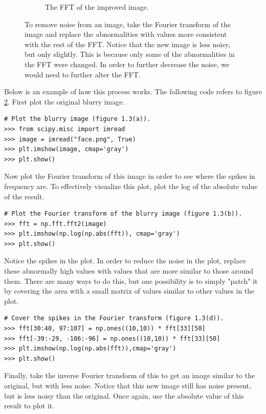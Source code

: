 \begin{figure}
\begin{subfigure}{.4\textwidth}
    \caption{The FFT of the improved image.}
    \label{fig:improved_face}
\end{subfigure}
\label{fig:image_fft}
\caption{To remove noise from an image, take the Fourier transform of the image and replace the abnormalities with values more consistent with the rest of the FFT. 
Notice that the new image is less noisy, but only slightly.
This is because only some of the abnormalities in the FFT were changed.
In order to further decrease the noise, we would need to further alter the FFT.}
\end{figure}

Below is an example of how this process works.
The following code refers to figure \ref{fig:image_fft}.
First plot the original blurry image.

\begin{lstlisting}
# Plot the blurry image (figure 1.3(a)).
>>> from scipy.misc import imread
>>> image = imread("face.png", True)
>>> plt.imshow(image, cmap='gray')
>>> plt.show()
\end{lstlisting}

Now plot the Fourier transform of this image in order to see where the spikes in frequency are.
To effectively visualize this plot, plot the log of the absolute value of the result.

\begin{lstlisting}
# Plot the Fourier transform of the blurry image (figure 1.3(b)).
>>> fft = np.fft.fft2(image)
>>> plt.imshow(np.log(np.abs(fft)), cmap='gray')
>>> plt.show()
\end{lstlisting}

Notice the spikes in the plot.
In order to reduce the noise in the plot, replace these abnormally high values with values that are more similar to those around them.
There are many ways to do this, but one possibility is to simply "patch" it by covering the area with a small matrix of values similar to other values in the plot.

\begin{lstlisting}
# Cover the spikes in the Fourier transform (figure 1.3(d)).
>>> fft[30:40, 97:107] = np.ones((10,10)) * fft[33][50]
>>> fft[-39:-29, -106:-96] = np.ones((10,10)) * fft[33][50]
>>> plt.imshow(np.log(np.abs(fft)),cmap='gray')
>>> plt.show()
\end{lstlisting}

Finally, take the inverse Fourier transform of this to get an image similar to the original, but with less noise.
Notice that this new image still has noise present, but is less noisy than the original.
Once again, use the absolute value of this result to plot it.

